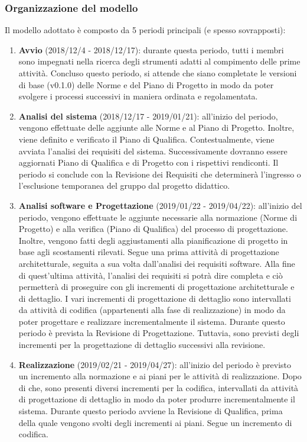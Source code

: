 \subsubsection{Organizzazione del modello}
Il modello adottato è composto da 5 periodi principali (e spesso sovrapposti):
\begin{enumerate}
	\item \textbf{Avvio} (2018/12/4 - 2018/12/17): durante questa periodo, tutti i membri sono impegnati nella ricerca degli strumenti adatti al compimento delle prime attività. Concluso questo periodo, si attende che siano completate le versioni di base (v0.1.0) delle Norme e del Piano di Progetto in modo da poter svolgere i processi successivi in maniera ordinata e regolamentata.
	\item \textbf{Analisi del sistema} (2018/12/17 - 2019/01/21): all'inizio del periodo, vengono effettuate delle aggiunte alle Norme e al Piano di Progetto. Inoltre, viene definito e verificato il Piano di Qualifica. Contestualmente, viene avviata l'analisi dei requisiti del sistema. Successivamente dovranno essere aggiornati Piano di Qualifica e di Progetto con i rispettivi rendiconti. Il periodo si conclude con la Revisione dei Requisiti che determinerà l'ingresso o l'esclusione temporanea del gruppo dal progetto didattico.
	\item \textbf{Analisi software e Progettazione} (2019/01/22 - 2019/04/22): all'inizio del periodo, vengono effettuate le aggiunte necessarie alla normazione (Norme di Progetto) e alla verifica (Piano di Qualifica) del processo di progettazione. Inoltre, vengono fatti degli aggiustamenti alla pianificazione di progetto in base agli scostamenti rilevati. Segue una prima attività di progettazione architetturale, seguita a sua volta dall'analisi dei requisiti software. Alla fine di quest'ultima attività, l'analisi dei requisiti si potrà dire completa e ciò permetterà di proseguire con gli incrementi di progettazione architetturale e di dettaglio. I vari incrementi di progettazione di dettaglio sono intervallati da attività di codifica (appartenenti alla fase di realizzazione) in modo da poter progettare e realizzare incrementalmente il sistema. Durante questo periodo è prevista la Revisione di Progettazione. Tuttavia, sono previsti degli incrementi per la progettazione di dettaglio successivi alla revisione.
	\item \textbf{Realizzazione} (2019/02/21 - 2019/04/27): all'inizio del periodo è previsto un incremento alla normazione e ai piani per le attività di realizzazione. Dopo di che, sono presenti diversi incrementi per la codifica, intervallati da attività di progettazione di dettaglio in modo da poter produrre incrementalmente il sistema. Durante questo periodo avviene la Revisione di Qualifica, prima della quale vengono svolti degli incrementi ai piani. Segue un incremento di codifica.

\end{enumerate}
